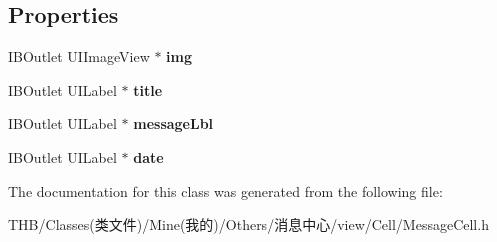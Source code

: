 \subsection*{Properties}
\begin{DoxyCompactItemize}
\item 
\mbox{\label{interface_message_cell_a76ed90a5928b5c798eca3866d926df74}} 
I\+B\+Outlet U\+I\+Image\+View $\ast$ {\bfseries img}
\item 
\mbox{\label{interface_message_cell_a37d5003e09716305f3f9d359a4d97e2c}} 
I\+B\+Outlet U\+I\+Label $\ast$ {\bfseries title}
\item 
\mbox{\label{interface_message_cell_a85a482c8255c929923d2dc1d28ab92a6}} 
I\+B\+Outlet U\+I\+Label $\ast$ {\bfseries message\+Lbl}
\item 
\mbox{\label{interface_message_cell_afa0edd97eaccdd1d91ac3c89d0552433}} 
I\+B\+Outlet U\+I\+Label $\ast$ {\bfseries date}
\end{DoxyCompactItemize}


The documentation for this class was generated from the following file\+:\begin{DoxyCompactItemize}
\item 
T\+H\+B/\+Classes(类文件)/\+Mine(我的)/\+Others/消息中心/view/\+Cell/Message\+Cell.\+h\end{DoxyCompactItemize}
